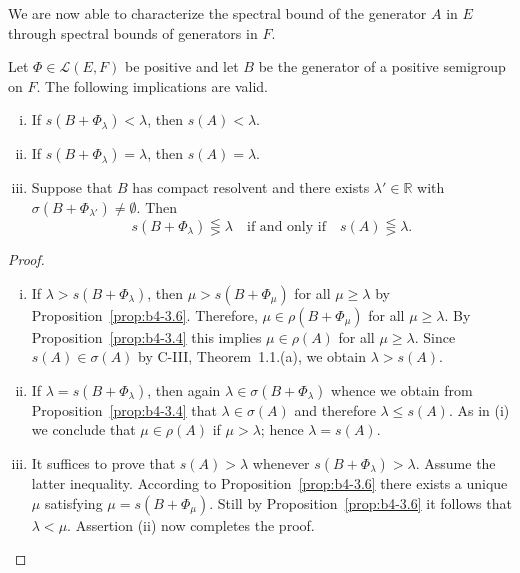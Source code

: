 We are now able to characterize the spectral bound of the generator $A$ in $E$ through spectral bounds of generators in $F$.
%
%
\begin{theorem}\label{thm:b4-3.7}
	Let $\Phi \in \mathcal{L}(E,F)$ be positive and let $B$ be the generator of a positive semigroup on $F$. 
	The following implications are valid.
	\begin{enumerate}[(i)]
		\item If $s(B + \Phi_{\lambda}) < \lambda$, then $s(A) < \lambda$.
		\item If $s(B + \Phi_{\lambda}) = \lambda$, then $s(A) = \lambda$.
		\item Suppose that $B$ has compact resolvent and there exists $\lambda' \in \mathbb{R}$ with $\sigma(B + \Phi_{\lambda'}) \neq \emptyset$. 
		Then
		\begin{equation}\label{eq:b4-3.6}
		s(B + \Phi_{\lambda}) \lesseqgtr \lambda \quad \text{if and only if} \quad s(A) \lesseqgtr \lambda.
		\end{equation}
	\end{enumerate}
\end{theorem}

\begin{proof}
	\begin{enumerate}[(i), wide]
	\item 
	If $\lambda > s(B + \Phi_{\lambda})$, then $\mu > s(B + \Phi_{\mu})$ for all $\mu \geq \lambda$ by Proposition~\ref{prop:b4-3.6}.  
	Therefore, $\mu \in \rho(B + \Phi_{\mu})$ for all $\mu \geq \lambda$. 
	By Proposition~\ref{prop:b4-3.4} this implies $\mu \in \rho(A)$ for all $\mu \geq \lambda$. 
	Since $s(A) \in \sigma(A)$ by C-III, Theorem~1.1.(a), we obtain $\lambda > s(A)$.
	\item 
	If $\lambda = s(B + \Phi_{\lambda})$, then again $\lambda \in \sigma(B + \Phi_{\lambda})$ whence we obtain from Proposition~\ref{prop:b4-3.4} that $\lambda \in \sigma(A)$ and therefore $\lambda \leq s(A)$. 
	As in (i) we conclude that $\mu \in \rho(A)$ if $\mu > \lambda$; hence $\lambda = s(A)$.
	
	\item 
	It suffices to prove that $s(A) > \lambda$ whenever $s(B + \Phi_{\lambda}) > \lambda$. 
	Assume the latter inequality. 
	According to Proposition~\ref{prop:b4-3.6} there exists a unique $\mu$ satisfying $\mu = s(B + \Phi_{\mu})$. 
	Still by Proposition~\ref{prop:b4-3.6} it follows that $\lambda < \mu$. 
	Assertion (ii) now completes the proof.
	\end{enumerate}
\end{proof}

